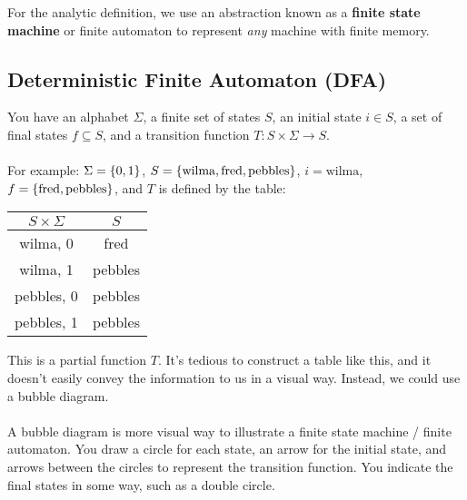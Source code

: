 \documentclass[]{article}
\DeclarePairedDelimiter{\set}{\lbrace}{\rbrace}
\theoremstyle{definition}
\begin{document}
		For the analytic definition, we use an abstraction known as a \textbf{finite state machine} or {finite automaton} to represent \emph{any} machine with finite memory.
		\subsection{Deterministic Finite Automaton (DFA)}
			You have an alphabet $\Sigma$, a finite set of states $S$, an initial state $i \in S$, a set of final states $f \subseteq S$, and a transition function $T: S \times \Sigma \to S$.
			\\ \\
			For example: $\Sigma = \set{0, 1}$, $S = \set{\text{wilma}, \text{fred}, \text{pebbles}}$, $i = \text{wilma}$, $f = \set{\text{fred}, \text{pebbles}}$, and $T$ is defined by the table:

			\begin{center}
				\begin{tabular}{|c|c|}
					\hline $S \times \Sigma$ & $S$ \\ \hline
					wilma, 0 & fred \\
					wilma, 1 & pebbles \\
					pebbles, 0 & pebbles \\
					pebbles, 1 & pebbles \\ \hline
				\end{tabular}
			\end{center}

			This is a partial function $T$. It's tedious to construct a table like this, and it doesn't easily convey the information to us in a visual way. Instead, we could use a bubble diagram.
			\\ \\
			A bubble diagram is more visual way to illustrate a finite state machine / finite automaton. You draw a circle for each state, an arrow for the initial state, and arrows between the circles to represent the transition function. You indicate the final states in some way, such as a double circle.
\end{document}
